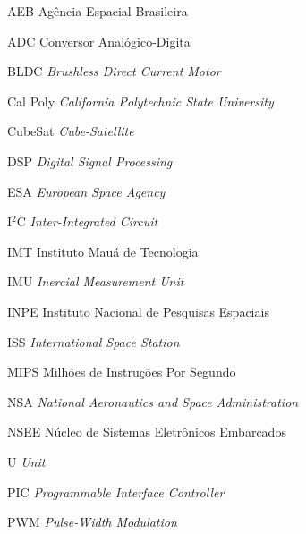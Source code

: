 \documentclass[
	12pt,				%
	openany,			%
	twoside,			%
	a4paper,			%
	english,			%
	french,				%
	spanish,			%
	brazil,				%
	oldfontcommands
	]{abntex2}
\begin{document}
\listoftables*
\cleardoublepage

\begin{siglas}

  \item[AEB] {Agência Espacial Brasileira}
  \item[ADC] {Conversor Analógico-Digita}
  \item[BLDC] \textit{Brushless Direct Current Motor}
  \item[Cal Poly] \textit{California Polytechnic State University}
  \item[CubeSat] \textit{Cube-Satellite}
  \item[DSP] \textit{Digital Signal Processing}
  \item[ESA] \textit{European Space Agency}
  \item[I$^{2}$C] \textit{Inter-Integrated Circuit}
  \item[IMT] {Instituto Mauá de Tecnologia}
  \item[IMU] \textit{Inercial Measurement Unit}
  \item[INPE] {Instituto Nacional de Pesquisas Espaciais}
  \item[ISS] \textit{International Space Station}
  \item[MIPS] {Milhões de Instruções Por Segundo}
  \item[NSA] \textit{National Aeronautics and Space Administration}
  \item[NSEE] {Núcleo de Sistemas Eletrônicos Embarcados}
  \item[U] \textit{Unit}
  \item[PIC] \textit{Programmable Interface Controller}
  \item[PWM] \textit{Pulse-Width Modulation}
    
\end{siglas}


\tableofcontents*
\cleardoublepage
\end{document}
